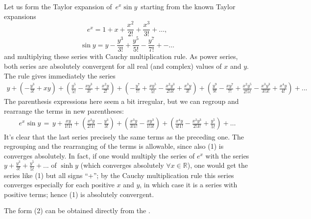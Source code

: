 \documentclass[12pt]{article}
\theoremstyle{definition}
\begin{document}

Let us form the Taylor expansion of\, $e^x\sin{y}$\, starting from the known Taylor expansions
$$e^x = 1+x+\frac{x^2}{2!}+\frac{x^3}{3!}+\ldots,$$
$$\sin{y} = y-\frac{y^3}{3!}+\frac{y^5}{5!}-\frac{y^7}{7!}+-\ldots$$
and multiplying these series with Cauchy multiplication rule.  As power series, both series are absolutely convergent for all real (and complex) values of $x$ and $y$.  The rule gives immediately the series
\begin{align} 
y\!+\!(-\frac{y^3}{3!}\!+\!xy)\!+\!(\frac{y^5}{5!}\!-\!\frac{xy^3}{3!}\!+\!\frac{x^2y}{2!})\!
+\!(-\frac{y^7}{7!}\!+\!\frac{xy^5}{5!}\!-\!\frac{x^2y^3}{2!3!}\!+\!\frac{x^3y}{3!})\!
+\!(\frac{y^9}{9!}\!-\!\frac{xy^7}{7!}\!+\!\frac{x^2y^5}{2!5!}\!-\!\frac{x^3y^3}{3!3!}\!+\!\frac{x^4y}{4!})\!+\!...
\end{align}
The parenthesis expressions here seem a bit irregular, but we can regroup and rearrange the terms in new parentheses:
\begin{align}
e^x\sin{y} \,=\, 
y+\frac{xy}{1!1!}+\left(\frac{x^2y}{2!1!}-\frac{y^3}{3!}\right)+\left(\frac{x^3y}{3!1!}-\frac{xy^3}{1!3!}\right)
+\left(\frac{x^4y}{4!1!}-\frac{x^2y^3}{2!3!}+\frac{y^5}{5!}\right)+\ldots
\end{align}
It's clear that the last series  precisely the same terms as the preceding one.  The regrouping and the rearranging of the terms is allowable, since also (1) is converges absolutely.  In fact, if one would multiply the series of $e^x$ with the series $y\!+\!\frac{y^3}{3!}\!+\!\frac{y^5}{5!}\!+\!...$ of $\sinh{y}$ (which converges absolutely $\forall x\in\mathbb{R}$), one would get the series like (1) but all signs ``+''; by the Cauchy multiplication rule this series converges especially for each positive $x$ and $y$, in which case it is a series with positive terms; hence (1) is absolutely convergent.

The form (2) can be obtained directly from the .
\end{document}
